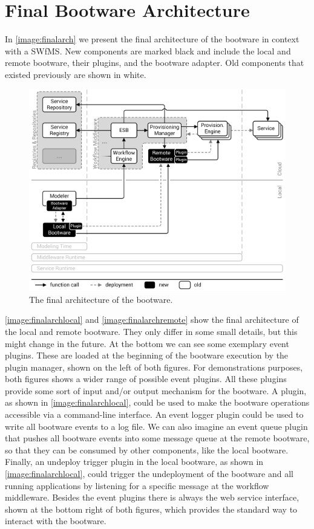 \section{Final Bootware Architecture}
\label{design:finalarch}

In \autoref{image:finalarch} we present the final architecture of the bootware in context with a SWfMS.
New components are marked black and include the local and remote bootware, their plugins, and the bootware adapter.
Old components that existed previously are shown in white.

\begin{figure}[!htbp]
	\centering
	\includegraphics[resolution=600]{design/assets/final_architecture}
	\caption{The final architecture of the bootware.}
	\label{image:finalarch}
\end{figure}

\autoref{image:finalarchlocal} and \autoref{image:finalarchremote} show the final architecture of the local and remote bootware.
They only differ in some small details, but this might change in the future.
At the bottom we can see some exemplary event plugins.
These are loaded at the beginning of the bootware execution by the plugin manager, shown on the left of both figures.
For demonstrations purposes, both figures shows a wider range of possible event plugins.
All these plugins provide some sort of input and/or output mechanism for the bootware.
A  plugin, as shown in \autoref{image:finalarchlocal}, could be used to make the bootware operations accessible via a command-line interface.
An event logger plugin could be used to write all bootware events to a log file.
We can also imagine an event queue plugin that pushes all bootware events into some message queue at the remote bootware, so that they can be consumed by other components, like the local bootware.
Finally, an undeploy trigger plugin in the local bootware, as shown in \autoref{image:finalarchlocal}, could trigger the undeployment of the bootware and all running applications by listening for a specific message at the workflow middleware.
Besides the event plugins there is always the web service interface, shown at the bottom right of both figures, which provides the standard way to interact with the bootware.


